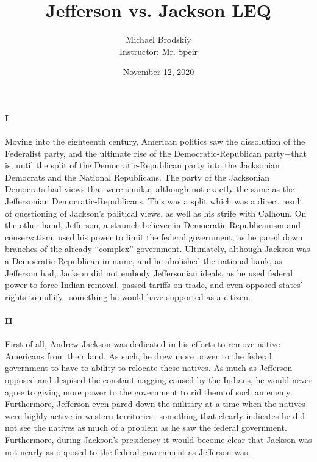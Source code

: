 \documentclass[12pt]{article}
\title{Jefferson vs. Jackson LEQ}
\date{November 12, 2020}
\author{Michael Brodskiy\\ \small Instructor: Mr. Speir}
\begin{document}
    \maketitle

    \paragraph{I} Moving into the eighteenth century, American politics saw the dissolution of the Federalist party, and the ultimate rise of the Democratic-Republican party$-$that is, until the split of the Democratic-Republican party into the Jacksonian Democrats and the National Republicans. The party of the Jacksonian Democrats had views that were similar, although not exactly the same as the Jeffersonian Democratic-Republicans. This was a split which was a direct result of questioning of Jackson's political views, as well as his strife with Calhoun. On the other hand, Jefferson, a staunch believer in Democratic-Republicanism and conservatism, used his power to limit the federal government, as he pared down branches of the already ``complex'' government. Ultimately, although Jackson was a Democratic-Republican in name, and he abolished the national bank, as Jefferson had, Jackson did not embody Jeffersonian ideals, as he used federal power to force Indian removal, passed tariffs on trade, and even opposed states' rights to nullify$-$something he would have supported as a citizen.
 
 
    \paragraph{II} First of all, Andrew Jackson was dedicated in his efforts to remove native Americans from their land. As such, he drew more power to the federal government to have to ability to relocate these natives. As much as Jefferson opposed and despised the constant nagging caused by the Indians, he would never agree to giving more power to the government to rid them of such an enemy. Furthermore, Jefferson even pared down the military at a time when the natives were highly active in western territories$-$something that clearly indicates he did not see the natives as much of a problem as he saw the federal government. Furthermore, during Jackson's presidency it would become clear that Jackson was not nearly as opposed to the federal government as Jefferson was.
\end{document}
